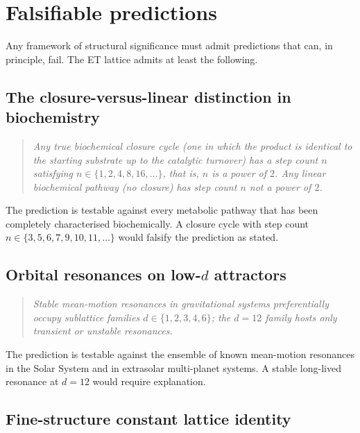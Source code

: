 \documentclass[11pt,a4paper]{article}
\theoremstyle{definition}
\theoremstyle{remark}
\begin{document}
\section{Falsifiable predictions}\label{sec:predictions}

Any framework of structural significance must admit predictions that can, in principle, fail. The ET lattice admits at least the following.

\subsection{The closure-versus-linear distinction in biochemistry}

\begin{quote}\itshape
Any true biochemical closure cycle (one in which the product is identical to the starting substrate up to the catalytic turnover) has a step count $n$ satisfying $n\in\{1,2,4,8,16,\ldots\}$, that is, $n$ is a power of $2$. Any linear biochemical pathway (no closure) has step count $n$ not a power of $2$.
\end{quote}

The prediction is testable against every metabolic pathway that has been completely characterised biochemically. A closure cycle with step count $n\in\{3,5,6,7,9,10,11,\ldots\}$ would falsify the prediction as stated.

\subsection{Orbital resonances on low-$d$ attractors}

\begin{quote}\itshape
Stable mean-motion resonances in gravitational systems preferentially occupy sublattice families $d\in\{1,2,3,4,6\}$; the $d=12$ family hosts only transient or unstable resonances.
\end{quote}

The prediction is testable against the ensemble of known mean-motion resonances in the Solar System and in extrasolar multi-planet systems. A stable long-lived resonance at $d=12$ would require explanation.

\subsection{Fine-structure constant lattice identity}
\end{document}
